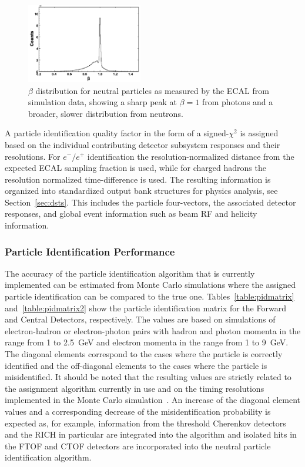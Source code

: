 \begin{figure}
\centering
\includegraphics[width=0.45\textwidth]{pics/neutral_beta.png}
\caption{$\beta$ distribution for neutral particles as measured by the ECAL from simulation data, showing a sharp
  peak at $\beta=1$ from photons and a broader, slower distribution from neutrons.}
\label{fig:neutbeta}
\end{figure}

A particle identification quality factor in the form of a signed-$\chi^2$ is assigned based on the individual
contributing detector subsystem responses and their resolutions. For $e^-/e^+$ identification the
resolution-normalized distance from the expected ECAL sampling fraction is used, while for charged hadrons the
resolution normalized time-difference is used. The resulting information is organized into standardized output
bank structures for physics analysis, see Section~\ref{sec:dsts}. This includes the particle four-vectors, the
associated detector responses, and global event information such as beam RF and helicity information.

\subsubsection{Particle Identification Performance}

The accuracy of the particle identification algorithm that is currently implemented can be estimated from
Monte Carlo simulations where the assigned particle identification can be compared to the true one.
Tables~\ref{table:pidmatrix} and~\ref{table:pidmatrix2} show the particle identification matrix for the Forward
and Central Detectors, respectively. The values are based on simulations of electron-hadron or electron-photon
pairs with hadron and photon momenta in the range from 1 to 2.5~GeV and electron momenta in the range from 1 to
9~GeV. The diagonal elements correspond to the cases where the particle is correctly identified and the off-diagonal
elements to the cases where the particle is misidentified. It should be noted that the resulting values are strictly
related to the assignment algorithm currently in use and on the timing resolutions implemented in the Monte Carlo
simulation~\cite{sim-nim}. An increase of the diagonal element values and a corresponding decrease of the
misidentification probability is expected as, for example, information from the threshold Cherenkov detectors and
the RICH in particular are integrated into the algorithm and isolated hits in the FTOF and CTOF detectors are
incorporated into the neutral particle identification algorithm.

